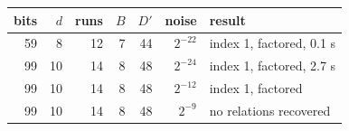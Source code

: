 \begin{tabular}{rrrrrrl}
\toprule
bits & $d$ & runs & $B$ & $D'$ & noise & result \\
\midrule
59 & 8 & 12 & 7 & 44 & $2^{-22}$ & index 1, factored, 0.1 s\\
99 & 10 & 14 & 8 & 48 & $2^{-24}$ & index 1, factored, 2.7 s\\
99 & 10 & 14 & 8 & 48 & $2^{-12}$ & index 1, factored\\
99 & 10 & 14 & 8 & 48 & $2^{-9}$ & no relations recovered\\
\bottomrule
\end{tabular}